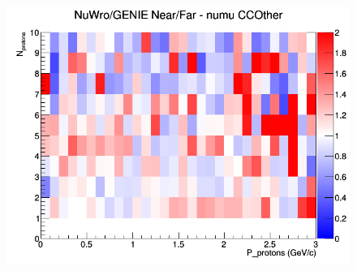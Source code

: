 \begin{figure}[h]
\endminipage
{}
\includegraphics[width=\linewidth]{N_P/nominal/protons/ratios/CCOther_NuWro_GENIE_numu_NF_N_P.png}
\endminipage
\newline
\end{figure}
\clearpage
